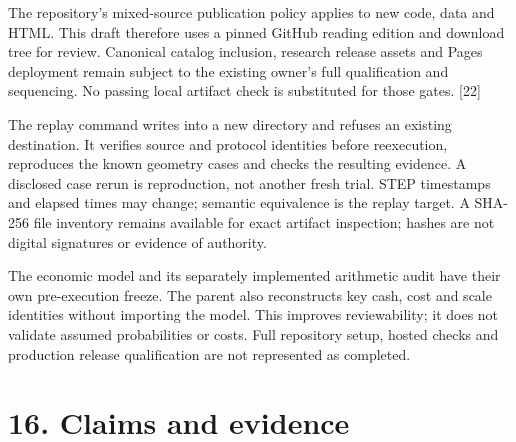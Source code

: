 \documentclass[11pt,letterpaper]{article}
\begin{document}
The repository's mixed-source publication policy applies to new code, data and HTML. This draft therefore uses a pinned GitHub reading edition and download tree for review. Canonical catalog inclusion, research release assets and Pages deployment remain subject to the existing owner's full qualification and sequencing. No passing local artifact check is substituted for those gates. {[}22{]}

The replay command writes into a new directory and refuses an existing destination. It verifies source and protocol identities before reexecution, reproduces the known geometry cases and checks the resulting evidence. A disclosed case rerun is reproduction, not another fresh trial. STEP timestamps and elapsed times may change; semantic equivalence is the replay target. A SHA-256 file inventory remains available for exact artifact inspection; hashes are not digital signatures or evidence of authority.

The economic model and its separately implemented arithmetic audit have their own pre-execution freeze. The parent also reconstructs key cash, cost and scale identities without importing the model. This improves reviewability; it does not validate assumed probabilities or costs. Full repository setup, hosted checks and production release qualification are not represented as completed.

\hypertarget{claims-and-evidence}{%
\section{16. Claims and evidence}\label{claims-and-evidence}}
\end{document}
